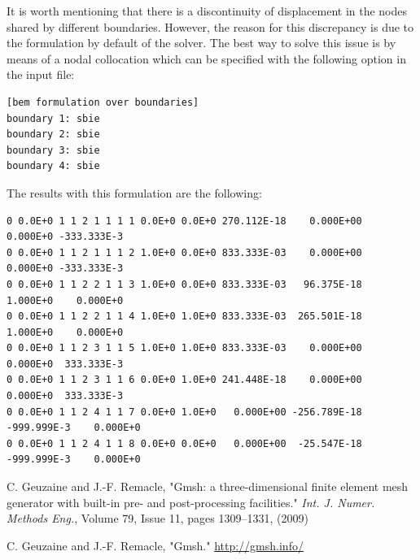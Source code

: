 \documentclass[A4]{article}
\begin{document}
It is worth mentioning that there is a discontinuity of displacement in the nodes shared by different boundaries. However, the reason for this discrepancy is due to the formulation by default of the solver. The best way to solve this issue is by means of a nodal collocation which can be specified with the following option in the input file: 

\begin{Verbatim}
[bem formulation over boundaries]
boundary 1: sbie
boundary 2: sbie
boundary 3: sbie
boundary 4: sbie
\end{Verbatim}

The results with this formulation are the following:

\begin{Verbatim}
0 0.0E+0 1 1 2 1 1 1 1 0.0E+0 0.0E+0 270.112E-18    0.000E+00    0.000E+0 -333.333E-3
0 0.0E+0 1 1 2 1 1 1 2 1.0E+0 0.0E+0 833.333E-03    0.000E+00    0.000E+0 -333.333E-3
0 0.0E+0 1 1 2 2 1 1 3 1.0E+0 0.0E+0 833.333E-03   96.375E-18    1.000E+0    0.000E+0
0 0.0E+0 1 1 2 2 1 1 4 1.0E+0 1.0E+0 833.333E-03  265.501E-18    1.000E+0    0.000E+0
0 0.0E+0 1 1 2 3 1 1 5 1.0E+0 1.0E+0 833.333E-03    0.000E+00    0.000E+0  333.333E-3
0 0.0E+0 1 1 2 3 1 1 6 0.0E+0 1.0E+0 241.448E-18    0.000E+00    0.000E+0  333.333E-3
0 0.0E+0 1 1 2 4 1 1 7 0.0E+0 1.0E+0   0.000E+00 -256.789E-18 -999.999E-3    0.000E+0
0 0.0E+0 1 1 2 4 1 1 8 0.0E+0 0.0E+0   0.000E+00  -25.547E-18 -999.999E-3    0.000E+0
\end{Verbatim}

\begin{thebibliography}{99}

	 C. Geuzaine and J.-F. Remacle, "Gmsh: a three-dimensional finite element mesh generator with built-in pre- and post-processing facilities." \emph{Int. J. Numer. Methods Eng.}, Volume 79, Issue 11, pages 1309--1331, (2009)
	
	  C. Geuzaine and J.-F. Remacle, "Gmsh." \url{http://gmsh.info/}
	
\end{thebibliography}
\end{document}
